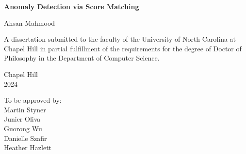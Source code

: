 \begin{titlepage}
\begin{center}


\vspace{2in}
\begin{singlespace}
\bf
Anomaly Detection via Score Matching
\end{singlespace}


\vspace{61pt} %
\large Ahsan Mahmood
\end{center}



\vspace{50pt}
\begin{singlespace}
\noindent \large
A dissertation submitted to the faculty of the University of North Carolina at Chapel Hill
in partial fulfillment of the requirements for the degree of Doctor of Philosophy in
the Department of Computer Science.
\end{singlespace}


\vspace{50pt}
\begin{center}
\begin{singlespace} \large
Chapel Hill\\
2024
\end{singlespace}
\end{center}


\vfill
\begin{flushright}
\begin{minipage}[t]{1.5in} \large
To be approved by: \\
Martin Styner \\
Junier Oliva \\
Guorong Wu \\
Danielle Szafir \\
Heather Hazlett
\end{minipage}
\end{flushright}

\end{titlepage}
